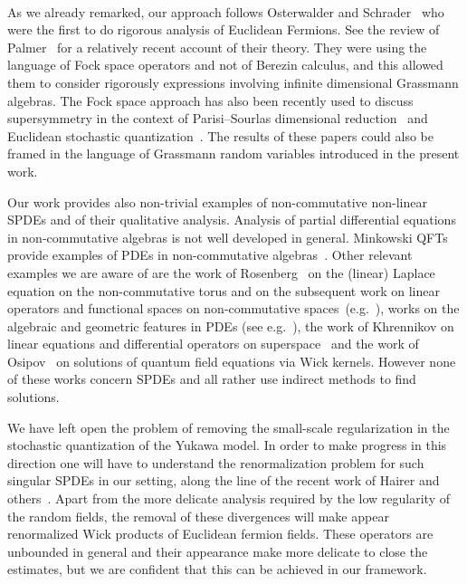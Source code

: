 \documentclass[11pt]{article}
\begin{document}
\

As we already remarked, our approach follows Osterwalder and
Schrader~{\cite{osterwalder_euclidean_1973,osterwalder_euclidean_1973-2}} who
were the first to do rigorous analysis of Euclidean Fermions. See the review
of Palmer~{\cite{palmer_euclidean_1980}} for a relatively recent account of
their theory. They were using the language of Fock space operators and not of
Berezin calculus, and this allowed them to consider rigorously expressions
involving infinite dimensional Grassmann algebras. The Fock space approach has
also been recently used to discuss supersymmetry in the context of
Parisi--Sourlas dimensional
reduction~{\cite{klein_supersymmetry_1983,klein_supersymmetry_1985}} and
Euclidean stochastic
quantization~{\cite{albeverio_elliptic_2018,albeverio_elliptic_2019,de_vecchi_note_2019}}.
The results of these papers could also be framed in the language of Grassmann
random variables introduced in the present work.

Our work provides also non-trivial examples of non-commutative non-linear
SPDEs and of their qualitative analysis. Analysis of partial differential
equations in non-commutative algebras is not well developed in general.
Minkowski QFTs provide examples of PDEs in non-commutative
algebras~{\cite{Segalbook}}. Other relevant examples we are aware of are the
work of Rosenberg~{\cite{rosenberg_noncommutative_2008}} on the (linear)
Laplace equation on the non-commutative torus and on the subsequent work on
linear operators and functional spaces on non-commutative
spaces~(e.g.~{\cite{savin_noncommutative_2010,xiong_sobolev_2018}}), works on
the algebraic and geometric features in PDEs (see
e.g.~{\cite{prastaro_geometry_1994,connes_noncommutative_1994}}), the work of
Khrennikov on linear equations and differential operators on
superspace~{\cite{khrennikov_equations_1991}} and the work of
Osipov~{\cite{osipov_quantum_2000}} on solutions of quantum field equations
via Wick kernels. However none of these works concern SPDEs and all rather use
indirect methods to find solutions.

We have left open the problem of removing the small-scale regularization in
the stochastic quantization of the Yukawa model. In order to make progress in
this direction one will have to understand the renormalization problem for
such singular SPDEs in our setting, along the line of the recent work of
Hairer and
others~{\cite{hairer_theory_2014,gubinelli_paracontrolled_2015,kupiainen_renormalization_2016}}.
Apart from the more delicate analysis required by the low regularity of the
random fields, the removal of these divergences will make appear renormalized
Wick products of Euclidean fermion fields. These operators are unbounded in
general and their appearance make more delicate to close the estimates, but we
are confident that this can be achieved in our framework.
\end{document}
